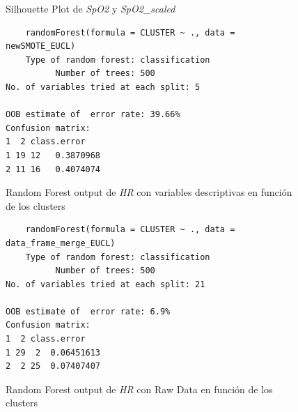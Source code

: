 \begin{figure}[ht]
    \centering
    \hfill
    \caption{Silhouette Plot de \textit{SpO2} y \textit{SpO2\_scaled}}\label{fig:raw_data_si_spo2}
\end{figure}

\begin{figure}[H]
    \centering
\begin{verbatim}
    randomForest(formula = CLUSTER ~ ., data = newSMOTE_EUCL) 
    Type of random forest: classification
          Number of trees: 500
No. of variables tried at each split: 5

OOB estimate of  error rate: 39.66%
Confusion matrix:
1  2 class.error
1 19 12   0.3870968
2 11 16   0.4074074
    \end{verbatim}
    \caption{Random Forest output de \textit{HR} con variables descriptivas en función de los clusters}\label{fig:raw_data_rf_fc_1}
\end{figure}
    

\begin{figure}[H]
    \centering
\begin{verbatim}
    randomForest(formula = CLUSTER ~ ., data = data_frame_merge_EUCL) 
    Type of random forest: classification
          Number of trees: 500
No. of variables tried at each split: 21

OOB estimate of  error rate: 6.9%
Confusion matrix:
1  2 class.error
1 29  2  0.06451613
2  2 25  0.07407407
    \end{verbatim}
    \caption{Random Forest output de \textit{HR} con Raw Data en función de los clusters}\label{fig:raw_data_rf_fc_2}
\end{figure}

